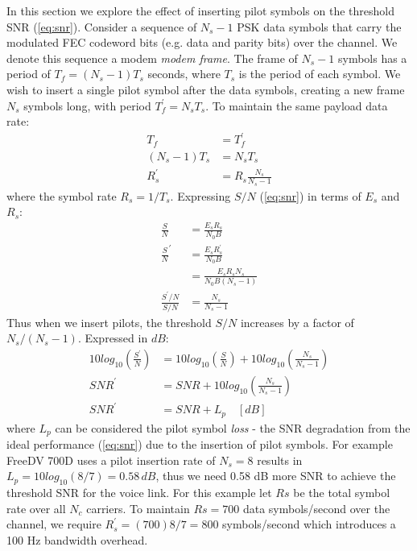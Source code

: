 \documentclass{article}
\begin{document}
In this section we explore the effect of inserting pilot symbols on the threshold SNR (\ref{eq:snr}). Consider a sequence of $N_s-1$ PSK data symbols that carry the modulated FEC codeword bits (e.g. data and parity bits) over the channel. We denote this sequence a modem \emph{modem frame}. The frame of $N_s-1$ symbols has a period of $T_f=(N_s-1)T_s$ seconds, where $T_s$ is the period of each symbol.  We wish to insert a single pilot symbol after the data symbols, creating a new frame $N_s$ symbols long, with period $T^\prime_f=N_sT_s$.  To maintain the same payload data rate:
\begin{equation}
\begin{split}
T_f &= T^\prime_f \\
(N_s-1)T_s &= N_sT_s \\
R^\prime_s &= R_s\frac{N_s}{N_s-1}
\end{split}
\end{equation}
where the symbol rate $R_s=1/T_s$.  Expressing $S/N$ (\ref{eq:snr}) in terms of $E_s$ and $R_s$:
\begin{equation}
\label{eq_snr_s}
\begin{split}
\frac{S}{N} &= \frac{E_sR_s}{N_0B} \\
\frac{S}{N}^\prime &= \frac{E_sR^\prime_s}{N_0B} \\
                   &= \frac{E_sR_sN_s}{N_0B(N_s-1)} \\
\frac{S^\prime/N}{S/N} &= \frac{N_s}{N_s-1}
\end{split}
\end{equation}
Thus when we insert pilots, the threshold $S/N$ increases by a factor of $N_s/(N_s-1)$. Expressed in $\si{dB}$:
\begin{equation}
\begin{split}
10log_{10}\left(\frac{S^\prime}{N}\right) &= 10log_{10}\left(\frac{S}{N}\right) + 10log_{10}\left(\frac{N_s}{N_s-1}\right) \\
SNR^\prime &= SNR + 10log_{10}\left(\frac{N_s}{N_s-1}\right) \\
SNR^\prime &= SNR + L_p  \quad [\si{dB}]
\end{split}
\end{equation}
where $L_p$ can be considered the pilot symbol \emph{loss} - the SNR degradation from the ideal performance (\ref{eq:snr}) due to the insertion of pilot symbols. For example FreeDV 700D uses a pilot insertion rate of $N_s=8$ results in $L_p=10log_{10}(8/7)=0.58 \, \si{dB}$, thus we need 0.58 dB more SNR to achieve the threshold SNR for the voice link.   For this example let $Rs$ be the total symbol rate over all $N_c$ carriers. To maintain $Rs=700$ data symbols/second over the channel, we require $R^\prime_s = (700)8/7 =800$ symbols/second which introduces a 100 Hz bandwidth overhead.
\end{document}
